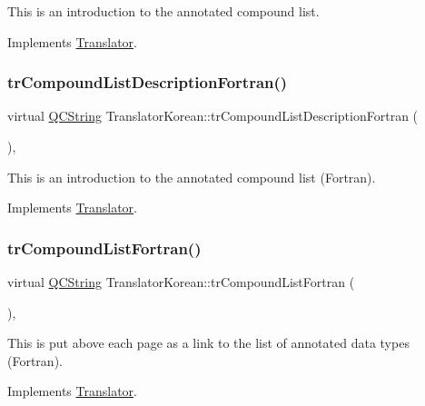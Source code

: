 This is an introduction to the annotated compound list. 

Implements \mbox{\hyperlink{class_translator}{Translator}}.

\mbox{\label{class_translator_korean_aa5ac6f40895c988e82a039f24d0d7af2}} 
\subsubsection{\texorpdfstring{trCompoundListDescriptionFortran()}{trCompoundListDescriptionFortran()}}
{\footnotesize\ttfamily virtual \mbox{\hyperlink{class_q_c_string}{Q\+C\+String}} Translator\+Korean\+::tr\+Compound\+List\+Description\+Fortran (\begin{DoxyParamCaption}{ }\end{DoxyParamCaption})\hspace{0.3cm}{\ttfamily [inline]}, {\ttfamily [virtual]}}

This is an introduction to the annotated compound list (Fortran). 

Implements \mbox{\hyperlink{class_translator}{Translator}}.

\mbox{\label{class_translator_korean_aaadeec829930d258a7064f6a90545d4f}} 
\subsubsection{\texorpdfstring{trCompoundListFortran()}{trCompoundListFortran()}}
{\footnotesize\ttfamily virtual \mbox{\hyperlink{class_q_c_string}{Q\+C\+String}} Translator\+Korean\+::tr\+Compound\+List\+Fortran (\begin{DoxyParamCaption}{ }\end{DoxyParamCaption})\hspace{0.3cm}{\ttfamily [inline]}, {\ttfamily [virtual]}}

This is put above each page as a link to the list of annotated data types (Fortran). 

Implements \mbox{\hyperlink{class_translator}{Translator}}.

